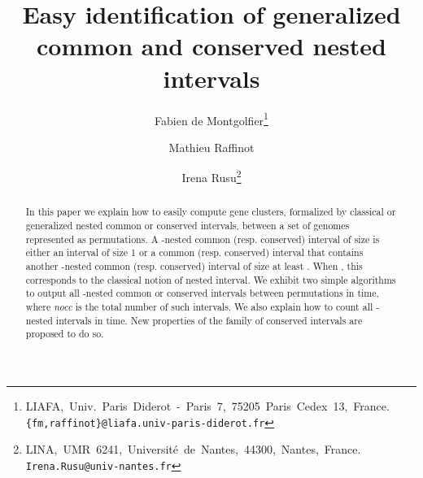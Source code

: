 \documentclass{article}
\begin{document}
  
  \linenumbers
  


\newcommand{\mC}{\mathcal{C}}  
\newcommand{\mF}{\mathcal{F}}  
\newcommand{\sign}{\mbox{\it sign}}
\newcommand{\PK}{\mathcal{P}}
\newcommand{\n}{[n]}
\newcommand{\Id}{\mbox{\it Id}}
\newcommand{\found}{\it found}
\newcommand{\larg}{\it large}
\newtheorem{remark}{Remark} 

\newtheorem{definition}{Definition}  
\newtheorem{proposition}{Proposition}  
\newtheorem{prop}{Property}  
\newtheorem{lemma}{Lemma}  
\newtheorem{cor}{Corollary}  
\newtheorem{corollary}{Corollary}  
\newtheorem{example}{Example}  
\newtheorem{invariant}{Invariant}  
\newtheorem{property}{Property}  
 
\newtheorem{theo}{Theorem}  
\newtheorem{theorem}{Theorem}  
 
\newenvironment{proof2}{\noindent {\it Proof.}}{\vskip1ex}  
\newenvironment{preuve}{\noindent {\it Proof.}}{\vskip1ex}  
\newenvironment{preuveA1}{\noindent {\it Proof of conservation of   
Property .}}{\vskip1ex}  
\newenvironment{preuveA2}{\noindent {\it Proof of conservation of   
Property .}}{\vskip1ex}  
\newenvironment{preuveB}{\noindent {\it Proof of the invariants.}}  
{\vskip1ex}  
\newenvironment{OJO}{\noindent {\bf OJO:}}{\vskip1ex}  
  


\title{Easy identification of generalized common and conserved nested intervals}    
   

\author{
Fabien de Montgolfier\thanks{\mbox{LIAFA, Univ. Paris Diderot - Paris 7, 75205 Paris Cedex 13, France.} {\tt \{fm,raffinot\}@liafa.univ-paris-diderot.fr}} \and Mathieu Raffinot \and Irena Rusu\thanks{\mbox{LINA, UMR 6241, Universit\'e de Nantes, 44300, Nantes, France.} {\tt Irena.Rusu@univ-nantes.fr}}} 
\maketitle 
  
  
\begin{abstract}

In this paper we explain how to easily compute gene clusters,
formalized by classical or generalized nested common or conserved
intervals, between a set of  genomes represented as 
permutations. A -nested common (resp. conserved) interval  of
size  is either an interval of size 1 or a common
(resp. conserved) interval that contains another -nested common
(resp. conserved) interval of size at least . When , this
corresponds to the classical notion of nested interval. We exhibit two
simple algorithms to output all -nested common or conserved
intervals between  permutations in  time,
where {\em nocc} is the total number of such intervals. We also
explain how to count all -nested intervals in  time. New properties of the family of conserved intervals are proposed to do so.
\end{abstract}  
  
\end{document}
